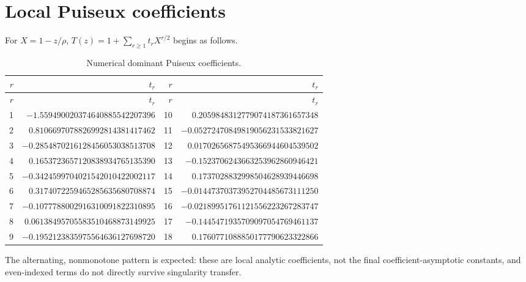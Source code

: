 \documentclass[11pt,a4paper,oneside,openany]{book}
\theoremstyle{definition}
\theoremstyle{remark}
\begin{document}
\section{Local Puiseux coefficients}
For $X=1-z/\rho$,
$T(z)=1+\sum_{r\ge1}t_rX^{r/2}$ begins as follows.
\begin{longtable}{r@{\qquad}r@{\qquad}r@{\qquad}r}
\caption{Numerical dominant Puiseux coefficients.}
\label{tab:t-audit}\\
\toprule
$r$ & $t_r$ & $r$ & $t_r$\\
\midrule
\endfirsthead
\toprule
$r$ & $t_r$ & $r$ & $t_r$\\
\midrule
\endhead
1  & $-1.559490020374640885542207396$ &
10 & $ 0.2059848312779074187361657348$\\
2  & $ 0.8106697078826992814381417462$ &
11 & $-0.05272470849819056231533821627$\\
3  & $-0.2854870216128456053038513708$ &
12 & $ 0.01702656875495366944604539502$\\
4  & $ 0.1653723657120838934765135390$ &
13 & $-0.1523706243663253962860946421$\\
5  & $-0.3424599704021542010422002117$ &
14 & $ 0.1737028832998504628939446698$\\
6  & $ 0.3174072259465285635680708874$ &
15 & $-0.01447370373952704485673111250$\\
7  & $-0.1077788002916310091822310895$ &
16 & $-0.02189951761121556223267283747$\\
8  & $ 0.06138495705583510468873149925$ &
17 & $-0.1445471935709097054769461137$\\
9  & $-0.1952123835975564636127698720$ &
18 & $ 0.1760771088850177790623322866$\\
\bottomrule
\end{longtable}
The alternating, nonmonotone pattern is expected: these are local analytic
coefficients, not the final coefficient-asymptotic constants, and even-indexed
terms do not directly survive singularity transfer.
\end{document}
